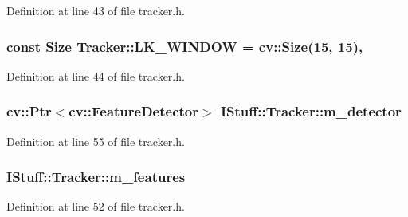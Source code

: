 Definition at line 43 of file tracker.\-h.

\hypertarget{class_i_stuff_1_1_tracker_af8521ba1a18dab69b2ff367799fc2101}{
\subsubsection[{L\-K\-\_\-\-W\-I\-N\-D\-O\-W}]{\setlength{\rightskip}{0pt plus 5cm}const Size Tracker\-::\-L\-K\-\_\-\-W\-I\-N\-D\-O\-W = cv\-::\-Size(15, 15)\hspace{0.3cm}{\ttfamily [static]}, {\ttfamily [private]}}}\label{class_i_stuff_1_1_tracker_af8521ba1a18dab69b2ff367799fc2101}


Definition at line 44 of file tracker.\-h.

\hypertarget{class_i_stuff_1_1_tracker_a7efbebcf19f9308ae8b74232d809e47a}{
\subsubsection[{m\-\_\-detector}]{\setlength{\rightskip}{0pt plus 5cm}cv\-::\-Ptr$<$cv\-::\-Feature\-Detector$>$ I\-Stuff\-::\-Tracker\-::m\-\_\-detector\hspace{0.3cm}{\ttfamily [private]}}}\label{class_i_stuff_1_1_tracker_a7efbebcf19f9308ae8b74232d809e47a}


Definition at line 55 of file tracker.\-h.

\hypertarget{class_i_stuff_1_1_tracker_a2e8d6c6201c9ea3a4d824404c917befe}{
\subsubsection[{m\-\_\-features}]{ I\-Stuff\-::\-Tracker\-::m\-\_\-features\hspace{0.3cm}{\ttfamily [private]}}}\label{class_i_stuff_1_1_tracker_a2e8d6c6201c9ea3a4d824404c917befe}


Definition at line 52 of file tracker.\-h.

